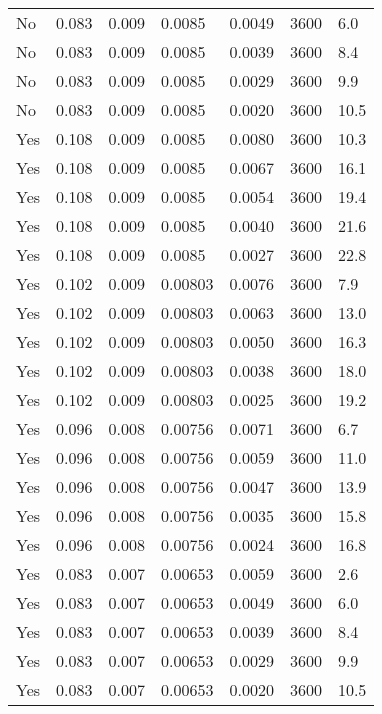 \begin{longtable}{p{}C{0.10\textwidth}C{0.10\textwidth}C{0.10\textwidth}C{0.10\textwidth}C{0.10\textwidth}C{0.10\textwidth}}
    No & 0.083 & 0.009 & 0.0085 & 0.0049 & 3600 & 6.0 \\
    No & 0.083 & 0.009 & 0.0085 & 0.0039 & 3600 & 8.4 \\
    No & 0.083 & 0.009 & 0.0085 & 0.0029 & 3600 & 9.9 \\
    No & 0.083 & 0.009 & 0.0085 & 0.0020 & 3600 & 10.5 \\
    Yes & 0.108 & 0.009 & 0.0085 & 0.0080 & 3600 & 10.3 \\
    Yes & 0.108 & 0.009 & 0.0085 & 0.0067 & 3600 & 16.1 \\
    Yes & 0.108 & 0.009 & 0.0085 & 0.0054 & 3600 & 19.4 \\
    Yes & 0.108 & 0.009 & 0.0085 & 0.0040 & 3600 & 21.6 \\
    Yes & 0.108 & 0.009 & 0.0085 & 0.0027 & 3600 & 22.8 \\
    Yes & 0.102 & 0.009 & 0.00803 & 0.0076 & 3600 & 7.9 \\
    Yes & 0.102 & 0.009 & 0.00803 & 0.0063 & 3600 & 13.0 \\
    Yes & 0.102 & 0.009 & 0.00803 & 0.0050 & 3600 & 16.3 \\
    Yes & 0.102 & 0.009 & 0.00803 & 0.0038 & 3600 & 18.0 \\
    Yes & 0.102 & 0.009 & 0.00803 & 0.0025 & 3600 & 19.2 \\
    Yes & 0.096 & 0.008 & 0.00756 & 0.0071 & 3600 & 6.7 \\
    Yes & 0.096 & 0.008 & 0.00756 & 0.0059 & 3600 & 11.0 \\
    Yes & 0.096 & 0.008 & 0.00756 & 0.0047 & 3600 & 13.9 \\
    Yes & 0.096 & 0.008 & 0.00756 & 0.0035 & 3600 & 15.8 \\
    Yes & 0.096 & 0.008 & 0.00756 & 0.0024 & 3600 & 16.8 \\
    Yes & 0.083 & 0.007 & 0.00653 & 0.0059 & 3600 & 2.6 \\
    Yes & 0.083 & 0.007 & 0.00653 & 0.0049 & 3600 & 6.0 \\
    Yes & 0.083 & 0.007 & 0.00653 & 0.0039 & 3600 & 8.4 \\
    Yes & 0.083 & 0.007 & 0.00653 & 0.0029 & 3600 & 9.9 \\
    Yes & 0.083 & 0.007 & 0.00653 & 0.0020 & 3600 & 10.5 \\
    \bottomrule
\end{longtable}

